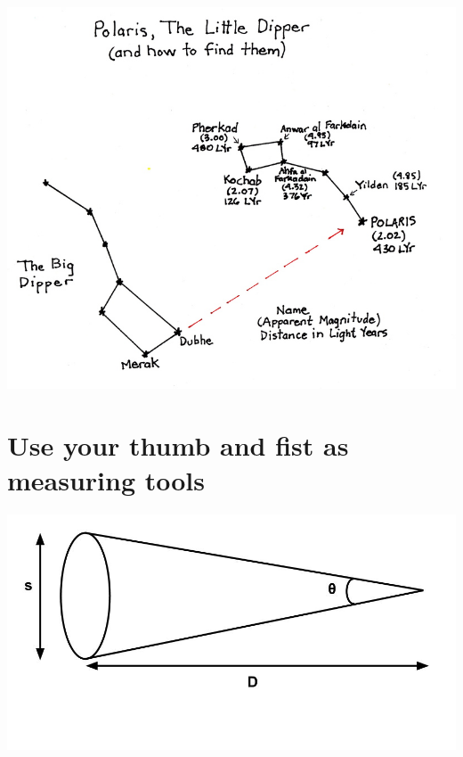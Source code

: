 \documentclass[10pt]{article}%
\begin{document}
\begin{center}
\includegraphics[scale=1.5]{little-dipper.jpg}
\end{center}



\section {Use your thumb and fist as measuring tools}

\begin{center}
\includegraphics[scale=0.25]{angularsize.jpg}
\vspace{-14pt}
\end{center}
\end{document}
